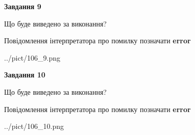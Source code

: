 \documentclass[12pt, ukrainian]{article}
\begin{document}
{{\begin {center}\textbf{Завдання 9}\end {center}}\par
Що буде виведено за виконання? \par
Повідомлення інтерпретатора про помилку позначати \textbf{error}

\begin{center}
	{../pict/106_9.png}
\end{center}
\newpage

{\begin {center}\textbf{Завдання 10}\end {center}}\par
Що буде виведено за виконання? \par
Повідомлення інтерпретатора про помилку позначати \textbf{error}

\begin{center}
	{../pict/106_10.png}
\end{center}
\newpage

}
\end{document}

